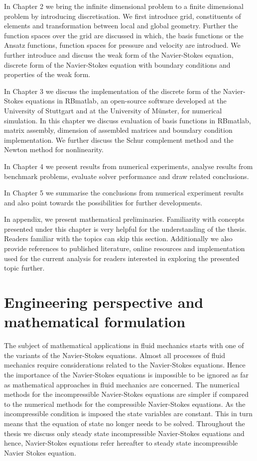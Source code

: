 \documentclass[a4paper,twoside,openright]{book}
\begin{document}
In Chapter 2 we bring the infinite dimensional problem to a finite dimensional problem by introducing discretisation. We first introduce grid, constituents of elements and transformation between local and global geometry. Further the function spaces over the grid are discussed in which, the basis functions or the Ansatz functions, function spaces for pressure and velocity are introdued. We further introduce and discuss the weak form of the Navier-Stokes equation, discrete form of the Navier-Stokes equation with boundary conditions and properties of the weak form.

In Chapter 3 we discuss the implementation of the discrete form of the Navier- Stokes equations in RBmatlab, an open-source software developed at the University of Stuttgart and at the University of M\"unster, for numerical simulation. In this chapter we discuss evaluation of basis functions in RBmatlab, matrix assembly, dimension of assembled matrices and boundary condition implementation. We further discuss the Schur complement method and the Newton method for nonlinearity.

In Chapter 4 we present results from numerical experiments, analyse results from benchmark problems, evaluate solver performance and draw related conclusions.

In Chapter 5 we summarise the conclusions from numerical experiment results and also point towards the possibilities for further developments.

In appendix, we present mathematical preliminaries. Familiarity with concepts presented under this chapter is very helpful for the understanding of the thesis. Readers familiar with the topics can skip this section. Additionally we also provide references to published literature, online resources and implementation used for the current analysis for readers interested in exploring the presented topic further.

\newpage

\chapter[Perspective and formulation]{Engineering perspective and mathematical formulation} 

The subject of mathematical applications in fluid mechanics starts with  one of the variants of the Navier-Stokes equations. Almost all processes of fluid mechanics require considerations related to the Navier-Stokes equations. Hence the importance of the Navier-Stokes equations is impossible to be ignored as far as mathematical approaches in fluid mechanics are concerned. The numerical methods for the incompressible Navier-Stokes equations are simpler if compared to the numerical methods for the compressible Navier-Stokes equations. As the incompressible condition is imposed the state variables are constant. This in turn means that the equation of state no longer needs to be solved. Throughout the thesis we discuss only steady state incompressible Navier-Stokes equations and hence, Navier-Stokes equations refer hereafter to steady state incompressible Navier Stokes equation.
\end{document}

